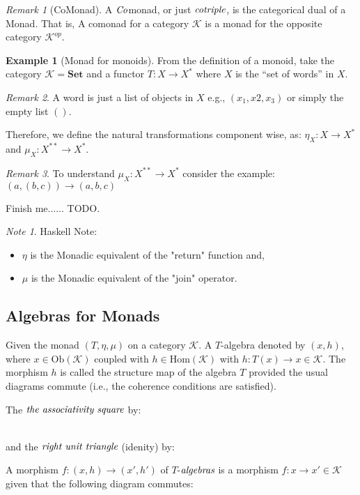 \documentclass[10pt, oneside, reqno]{amsart}
\theoremstyle{plain}%
\theoremstyle{definition}
\newtheorem{exmp}[thm]{Example}
\theoremstyle{remark}
\newtheorem*{rem}{Remark}
\newtheorem*{note}{Note}
\newcommand{\Id}{\mathit{id}_}
\begin{document}
\begin{rem}[CoMonad]
 A $\emph{Co}$monad, or just $\emph{cotriple}$, is the categorical dual of a Monad.
 That is, A comonad for a category $\mathcal{K}$ is a monad for the opposite category $\mathcal{K}^{op}$.
\end{rem}


\begin{exmp}[Monad for monoids]
 From the definition of a monoid,
 take the category $\mathcal{K} = \textbf{Set}$ and a functor $T: X \to X^{*}$ where $X$ is the ``set of words'' in $X$.
 \begin{rem}
  A word is just a list of objects in $X$ e.g., $(x_{1}, x{2}, x_{3})$ or simply the empty list $()$.
 \end{rem}
 Therefore, we define the natural transformations component wise, as: $\eta_{X}: X \to X^{*}$ and $\mu_{X}: X^{**} \to X^{*}$.
 \begin{rem}
  To understand $\mu_{X}: X^{**} \to X^{*}$ consider the example: $(a, (b, c)) \to (a, b, c)$
 \end{rem}
 Finish me...... TODO.
\end{exmp}

\begin{note}
Haskell Note:
\begin{itemize}
 \item $\eta$ is the Monadic equivalent of the "return" function and,
 \item $\mu$ is the Monadic equivalent of the "join" operator.
\end{itemize}
\end{note}


\subsection{Algebras for Monads} %
\label{sec:monadalgebra}
Given the monad $(T, \eta, \mu)$ on a category $\mathcal{K}$. A $T$-algebra denoted by $(x,h)$,
where $x \in \text{Ob}(\mathcal{K})$ coupled with $h \in \text{Hom}(\mathcal{K})$ with
$h: T(x) \to x \in \mathcal{K}$. The morphism $h$ is called the structure map of the algebra $T$ provided
the usual diagrams commute (i.e., the coherence conditions are satisfied).

The $\emph{the associativity square}$ by:
\\
and the $\emph{right unit triangle}$ (idenity) by:

A morphism $f: (x,h) \to (x',h')$ of $T$-$\emph{algebras}$ is a morphism $f: x \to x' \in \mathcal{K}$
given that the following diagram commutes:
\end{document}
